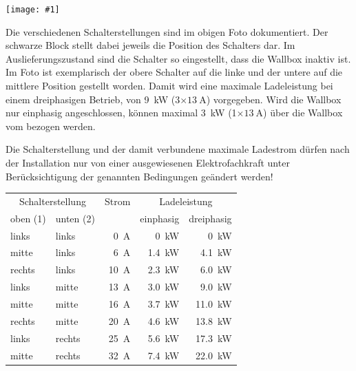 \documentclass[a4paper,10pt]{article}
\newcommand{\hint}[1]{\begin{tcolorbox}[colback=boxgray,colframe=black,coltext=
white,title=Hinweis,left*=2mm,right*=2mm,boxsep=1mm,bottom=1mm,top=1mm]#1\end{tcolorbox}}
\newcommand{\gfx}[1]{\texttt{[image: \#1]}}
\begin{document}
\begin{multicols*}{2}
	\gfx{./img_warp2/resized/warp2_current_configure_w_caption_600}

	Die verschiedenen Schalterstellungen sind im obigen Foto dokumentiert.
	Der schwarze Block stellt dabei jeweils die Position
	des Schalters dar. Im Auslieferungszustand sind die Schalter so eingestellt,
	dass die Wallbox inaktiv ist. Im Foto ist exemplarisch der obere
	Schalter auf die linke und der untere auf die mittlere Position gestellt
	worden. Damit wird eine maximale Ladeleistung bei einem dreiphasigen
	Betrieb, von \SI{9}{\kilo\watt} (3$\times\SI{13}{\ampere}$) vorgegeben.
	Wird die Wallbox nur einphasig angeschlossen, können maximal
	\SI{3}{\kilo\watt} (1$\times\SI{13}{\ampere}$) über die Wallbox vom
	bezogen werden.

	\hint{Die Schalterstellung und der damit verbundene maximale Ladestrom dürfen nach der
	      Installation nur von einer ausgewiesenen Elektrofachkraft unter
	      Berücksichtigung der genannten Bedingungen geändert werden!}

	\begin{tabular}{lp{}rrr}
		\toprule
		\multicolumn{2}{c}{Schalterstellung} & Strom            & \multicolumn{2}{c}{Ladeleistung}             \\
		\small{oben (1)} & \small{unten (2)} &                  & \small{einphasig}    & \small{dreiphasig}    \\
		\midrule
		links            & links             & \SI{0}{\ampere}  & \SI{0}{\kilo\watt}   & \SI{0}{\kilo\watt}    \\
		mitte            & links             & \SI{6}{\ampere}  & \SI{1.4}{\kilo\watt} & \SI{4.1}{\kilo\watt}  \\
		rechts           & links             & \SI{10}{\ampere} & \SI{2.3}{\kilo\watt} & \SI{6.0}{\kilo\watt}  \\
		links            & mitte             & \SI{13}{\ampere} & \SI{3.0}{\kilo\watt} & \SI{9.0}{\kilo\watt}  \\
		mitte            & mitte             & \SI{16}{\ampere} & \SI{3.7}{\kilo\watt} & \SI{11.0}{\kilo\watt} \\
		rechts           & mitte             & \SI{20}{\ampere} & \SI{4.6}{\kilo\watt} & \SI{13.8}{\kilo\watt} \\
		links            & rechts            & \SI{25}{\ampere} & \SI{5.6}{\kilo\watt} & \SI{17.3}{\kilo\watt} \\
		mitte            & rechts            & \SI{32}{\ampere} & \SI{7.4}{\kilo\watt} & \SI{22.0}{\kilo\watt} \\
		\bottomrule
	\end{tabular}


\end{multicols*}
\end{document}
